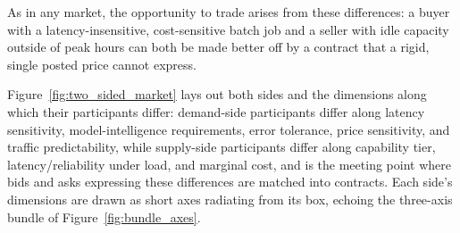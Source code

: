 As in any market, the opportunity to trade arises from these differences:
a buyer with a latency-insensitive, cost-sensitive batch job and a seller
with idle capacity outside of peak hours can both be made better off by a
contract that a rigid, single posted price cannot express.

Figure~\ref{fig:two_sided_market} lays out both sides and the dimensions
along which their participants differ: demand-side participants differ
along latency sensitivity, model-intelligence requirements, error
tolerance, price sensitivity, and traffic predictability, while
supply-side participants differ along capability tier, latency/reliability
under load, and marginal cost, and \NoesisMarket{} is the meeting point
where bids and asks expressing these differences are matched into
contracts. Each side's dimensions are drawn as short axes radiating from
its box, echoing the three-axis bundle of Figure~\ref{fig:bundle_axes}.

